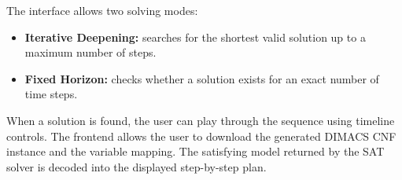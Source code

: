 \noindent The interface allows two solving modes:

\begin{itemize}
    \item \textbf{Iterative Deepening:} searches for the shortest valid solution up to a maximum number of steps.
    \item \textbf{Fixed Horizon:} checks whether a solution exists for an exact number of time steps.
\end{itemize}

\noindent When a solution is found, the user can play through the sequence using timeline controls.
The frontend allows the user to download the generated DIMACS CNF instance and the variable mapping.
The satisfying model returned by the SAT solver is decoded into the displayed step-by-step plan.
